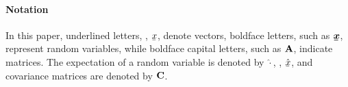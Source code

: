 \paragraph*{Notation}
%
In this paper, underlined letters, \eg, $\vx$, denote vectors, boldface letters, such as $\rvx$, represent random variables, while boldface capital letters, such as ${{\mathbf{A}}}$, indicate matrices.
The expectation of a random variable is denoted by $\hat{\cdot}$, \eg, $\evx$, and covariance matrices are denoted by ${{\mathbf{C}}}$.
